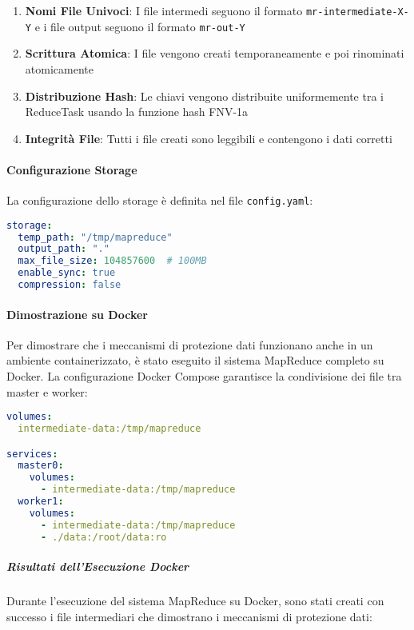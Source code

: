 \documentclass[12pt,a4paper]{article}
\begin{document}
\begin{enumerate}
\item \textbf{Nomi File Univoci}: I file intermedi seguono il formato \texttt{mr-intermediate-X-Y} e i file output seguono il formato \texttt{mr-out-Y}
\item \textbf{Scrittura Atomica}: I file vengono creati temporaneamente e poi rinominati atomicamente
\item \textbf{Distribuzione Hash}: Le chiavi vengono distribuite uniformemente tra i ReduceTask usando la funzione hash FNV-1a
\item \textbf{Integrità File}: Tutti i file creati sono leggibili e contengono i dati corretti
\end{enumerate}

\paragraph{Configurazione Storage}

La configurazione dello storage è definita nel file \texttt{config.yaml}:

\begin{lstlisting}[language=yaml, caption=Configurazione storage]
storage:
  temp_path: "/tmp/mapreduce"
  output_path: "."
  max_file_size: 104857600  # 100MB
  enable_sync: true
  compression: false
\end{lstlisting}

\paragraph{Dimostrazione su Docker}

Per dimostrare che i meccanismi di protezione dati funzionano anche in un ambiente containerizzato, è stato eseguito il sistema MapReduce completo su Docker. La configurazione Docker Compose garantisce la condivisione dei file tra master e worker:

\begin{lstlisting}[language=yaml, caption=Configurazione Docker per condivisione file]
volumes:
  intermediate-data:/tmp/mapreduce

services:
  master0:
    volumes:
      - intermediate-data:/tmp/mapreduce
  worker1:
    volumes:
      - intermediate-data:/tmp/mapreduce
      - ./data:/root/data:ro
\end{lstlisting}

\subparagraph{Risultati dell'Esecuzione Docker}

Durante l'esecuzione del sistema MapReduce su Docker, sono stati creati con successo i file intermediari che dimostrano i meccanismi di protezione dati:
\end{document}
